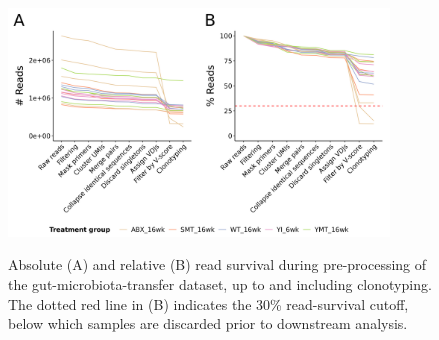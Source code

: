\begin{figure}
\centering
\includegraphics[width = 0.9\textwidth]{_Figures/png/gut-read-survival-all.png}
\begin{subfigure}{0em}
\label{fig:igseq-gut-read-survival-all-abs}
\end{subfigure}
\begin{subfigure}{0em}
\label{fig:igseq-gut-read-survival-all-rel}
\end{subfigure}
\caption{Absolute (A) and relative (B) read survival during pre-processing of the \igseq gut-microbiota-transfer dataset, up to and including clonotyping. The dotted red line in (B) indicates the 30\% read-survival cutoff, below which samples are discarded prior to downstream analysis.}
\label{fig:igseq-gut-read-survival-all}
\end{figure}

